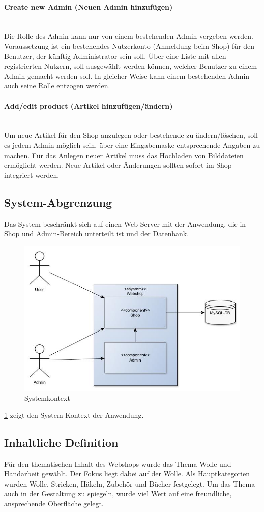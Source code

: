 \paragraph{Create new Admin (Neuen Admin hinzufügen)}$\;$ \\
Die Rolle des Admin kann nur von einem bestehenden Admin vergeben werden.
Voraussetzung ist ein bestehendes Nutzerkonto (Anmeldung beim Shop) für den Benutzer, der künftig Administrator sein soll.
Über eine Liste mit allen registrierten Nutzern, soll ausgewählt werden können, welcher Benutzer zu einem Admin gemacht werden soll.
In gleicher Weise kann einem bestehenden Admin auch seine Rolle entzogen werden.
\paragraph{Add/edit product (Artikel hinzufügen/ändern)}$\;$ \\
Um neue Artikel für den Shop anzulegen oder bestehende zu ändern/löschen, soll es jedem Admin möglich sein, über eine Eingabemaske entsprechende Angaben zu machen.
Für das Anlegen neuer Artikel muss das Hochladen von Bilddateien ermöglicht werden.
Neue Artikel oder Änderungen sollten sofort im Shop integriert werden.
\subsection{System-Abgrenzung}
Das System beschränkt sich auf einen Web-Server mit der Anwendung, die in Shop und Admin-Bereich unterteilt ist und der Datenbank.
\begin{figure}[ht!]
	\centering
	\includegraphics[width=\linewidth]{bilder/kap4/system_abgrenzung}
	\caption{Systemkontext}
	\label{fig:system_context}
\end{figure}
\cref{fig:system_context} zeigt den System-Kontext der Anwendung.
\subsection{Inhaltliche Definition}
Für den thematischen Inhalt des Webshops wurde das Thema Wolle und Handarbeit gewählt.
Der Fokus liegt dabei auf der Wolle. Als Hauptkategorien wurden Wolle, Stricken, Häkeln, Zubehör und Bücher festgelegt.
Um das Thema auch in der Gestaltung zu spiegeln, wurde viel Wert auf eine freundliche, ansprechende Oberfläche gelegt.

